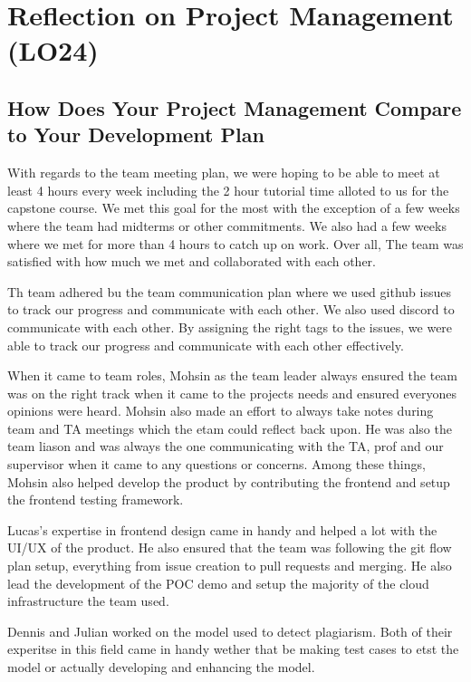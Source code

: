 \documentclass{article}
\begin{document}
\section{Reflection on Project Management (LO24)}

\subsection{How Does Your Project Management Compare to Your Development Plan}

With regards to the team meeting plan, we were hoping to be able to meet at least 4 hours every week
including the 2 hour tutorial time alloted to us for the capstone course. We met this goal for the most
with the exception of a few weeks where the team had midterms or other commitments. 
We also had a few weeks where we met for more than 4 hours to catch up on work. Over all,
The team was satisfied with how much we met and collaborated with each other.

Th team adhered bu the team communication plan where we used github issues to track our
progress and communicate with each other. We also used discord to communicate with each other.
By assigning the right tags to the issues, we were able to track our progress and communicate with each other effectively.

When it came to team roles, Mohsin as the team leader always ensured the team was on the right
track when it came to the projects needs and ensured everyones opinions were heard. Mohsin also made 
an effort to always take notes during team and TA meetings which the etam could reflect back upon.
He was also the team liason and was always the one communicating with the TA, prof and our supervisor
when it came to any questions or concerns. Among these things, Mohsin also helped develop the product
by contributing the frontend and setup the frontend testing framework.

Lucas's expertise in frontend design came in handy and helped a lot with the UI/UX of the product. He also
ensured that the team was following the git flow plan setup, everything from issue creation to pull requests and merging.
He also lead the development of the POC demo and setup the majority of the cloud infrastructure the team used.

Dennis and Julian worked on the model used to detect plagiarism. Both of their experitse in
this field came in handy wether that be making test cases to etst the model or actually developing and enhancing the model.
\end{document}
